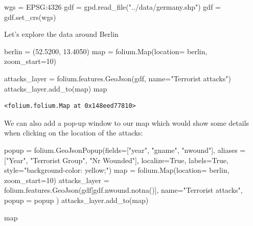 \documentclass[
  letterpaper,
  DIV=11,
  numbers=noendperiod]{scrreprt}
\newenvironment{Shaded}{\begin{snugshade}}{\end{snugshade}}
\newcommand{\BuiltInTok}[1]{\textcolor[rgb]{0.00,0.23,0.31}{#1}}
\newcommand{\DecValTok}[1]{\textcolor[rgb]{0.68,0.00,0.00}{#1}}
\newcommand{\FloatTok}[1]{\textcolor[rgb]{0.68,0.00,0.00}{#1}}
\newcommand{\NormalTok}[1]{\textcolor[rgb]{0.00,0.23,0.31}{#1}}
\newcommand{\OperatorTok}[1]{\textcolor[rgb]{0.37,0.37,0.37}{#1}}
\newcommand{\StringTok}[1]{\textcolor[rgb]{0.13,0.47,0.30}{#1}}
\newcommand{\VariableTok}[1]{\textcolor[rgb]{0.07,0.07,0.07}{#1}}
\begin{document}
\begin{Shaded}
\begin{Highlighting}[]
\NormalTok{wgs }\OperatorTok{=} \StringTok{\textquotesingle{}EPSG:4326\textquotesingle{}}
\NormalTok{gdf }\OperatorTok{=}\NormalTok{ gpd.read\_file(}\StringTok{"../data/germany.shp"}\NormalTok{)}
\NormalTok{gdf }\OperatorTok{=}\NormalTok{ gdf.set\_crs(wgs)}
\end{Highlighting}
\end{Shaded}

Let's explore the data around Berlin

\begin{Shaded}
\begin{Highlighting}[]
\NormalTok{berlin }\OperatorTok{=}\NormalTok{ (}\FloatTok{52.5200}\NormalTok{, }\FloatTok{13.4050}\NormalTok{)}
\BuiltInTok{map} \OperatorTok{=}\NormalTok{ folium.Map(location}\OperatorTok{=}\NormalTok{ berlin, zoom\_start}\OperatorTok{=}\DecValTok{10}\NormalTok{)}

\NormalTok{attacks\_layer }\OperatorTok{=}\NormalTok{ folium.features.GeoJson(gdf, name}\OperatorTok{=}\StringTok{"Terrorist attacks"}\NormalTok{)}
\NormalTok{attacks\_layer.add\_to(}\BuiltInTok{map}\NormalTok{)}
\BuiltInTok{map}
\end{Highlighting}
\end{Shaded}

\begin{verbatim}
<folium.folium.Map at 0x148eed77810>
\end{verbatim}

We can also add a pop-up window to our map which would show some details
when clicking on the location of the attacks:

\begin{Shaded}
\begin{Highlighting}[]
\NormalTok{popup }\OperatorTok{=}\NormalTok{ folium.GeoJsonPopup(fields}\OperatorTok{=}\NormalTok{[}\StringTok{"year"}\NormalTok{, }\StringTok{"gname"}\NormalTok{, }\StringTok{"nwound"}\NormalTok{], aliases }\OperatorTok{=}\NormalTok{[}\StringTok{"Year"}\NormalTok{, }\StringTok{"Terrorist Group"}\NormalTok{, }\StringTok{"Nr Wounded"}\NormalTok{], localize}\OperatorTok{=}\VariableTok{True}\NormalTok{, labels}\OperatorTok{=}\VariableTok{True}\NormalTok{,}
\NormalTok{                            style}\OperatorTok{=}\StringTok{"background{-}color: yellow;"}\NormalTok{)}
\BuiltInTok{map} \OperatorTok{=}\NormalTok{ folium.Map(location}\OperatorTok{=}\NormalTok{ berlin, zoom\_start}\OperatorTok{=}\DecValTok{10}\NormalTok{)}
\NormalTok{attacks\_layer }\OperatorTok{=}\NormalTok{ folium.features.GeoJson(gdf[gdf.nwound.notna()], name}\OperatorTok{=}\StringTok{"Terrorist attacks"}\NormalTok{, popup }\OperatorTok{=}\NormalTok{ popup )}
\NormalTok{attacks\_layer.add\_to(}\BuiltInTok{map}\NormalTok{)}

\BuiltInTok{map}
\end{Highlighting}
\end{Shaded}
\end{document}
